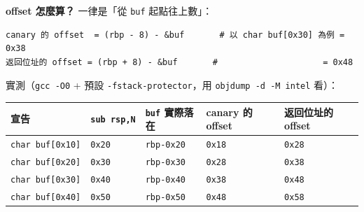 \documentclass[10pt,a4paper]{article}
\newcounter{none}
\begin{document}
\textbf{offset 怎麼算？} 一律是「從 \texttt{buf} 起點往上數」：

\begin{Verbatim}[breaklines=true,breakanywhere=true,breakautoindent=false,fontsize=\fontsize{7.0}{9.5}\selectfont]
canary 的 offset  = (rbp - 8) - &buf       # 以 char buf[0x30] 為例 = 0x38
返回位址的 offset = (rbp + 8) - &buf       #                     = 0x48
\end{Verbatim}

實測（\texttt{gcc\ \allowbreak{}-\allowbreak{}O0} + 預設 \texttt{-\allowbreak{}fstack-\allowbreak{}protector}，用
\texttt{objdump\ \allowbreak{}-\allowbreak{}d\ \allowbreak{}-\allowbreak{}M\ \allowbreak{}intel} 看）：

{\def\LTcaptype{none} %
\begin{longtable}[]{@{}
  >{\raggedright\arraybackslash}p{}
  >{\raggedright\arraybackslash}p{}
  >{\raggedright\arraybackslash}p{}
  >{\raggedright\arraybackslash}p{}
  >{\raggedright\arraybackslash}p{}@{}}
\toprule\noalign{}
\begin{minipage}[b]{\linewidth}\raggedright
宣告
\end{minipage} & \begin{minipage}[b]{\linewidth}\raggedright
\texttt{sub\ \allowbreak{}rsp,\allowbreak{}N}
\end{minipage} & \begin{minipage}[b]{\linewidth}\raggedright
\texttt{buf} 實際落在
\end{minipage} & \begin{minipage}[b]{\linewidth}\raggedright
canary 的 offset
\end{minipage} & \begin{minipage}[b]{\linewidth}\raggedright
返回位址的 offset
\end{minipage} \\
\midrule\noalign{}
\endhead
\bottomrule\noalign{}
\endlastfoot
\texttt{char\ \allowbreak{}buf{[}0x10{]}} & \texttt{0x20} & \texttt{rbp-\allowbreak{}0x20} &
\texttt{0x18} & \texttt{0x28} \\
\texttt{char\ \allowbreak{}buf{[}0x20{]}} & \texttt{0x30} & \texttt{rbp-\allowbreak{}0x30} &
\texttt{0x28} & \texttt{0x38} \\
\texttt{char\ \allowbreak{}buf{[}0x30{]}} & \texttt{0x40} & \texttt{rbp-\allowbreak{}0x40} &
\texttt{0x38} & \texttt{0x48} \\
\texttt{char\ \allowbreak{}buf{[}0x40{]}} & \texttt{0x50} & \texttt{rbp-\allowbreak{}0x50} &
\texttt{0x48} & \texttt{0x58} \\
\end{longtable}
}
\end{document}
